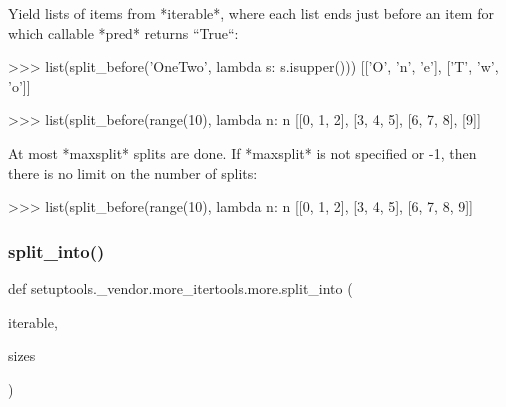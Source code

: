 \begin{DoxyVerb}Yield lists of items from *iterable*, where each list ends just before
an item for which callable *pred* returns ``True``:

    >>> list(split_before('OneTwo', lambda s: s.isupper()))
    [['O', 'n', 'e'], ['T', 'w', 'o']]

    >>> list(split_before(range(10), lambda n: n %
    [[0, 1, 2], [3, 4, 5], [6, 7, 8], [9]]

At most *maxsplit* splits are done. If *maxsplit* is not specified or -1,
then there is no limit on the number of splits:

    >>> list(split_before(range(10), lambda n: n %
    [[0, 1, 2], [3, 4, 5], [6, 7, 8, 9]]
\end{DoxyVerb}
 \mbox{\label{namespacesetuptools_1_1__vendor_1_1more__itertools_1_1more_a5ed35ee953b8004cf902dcd7b31714f3}} 
\subsubsection{\texorpdfstring{split\+\_\+into()}{split\_into()}}
{\footnotesize\ttfamily def setuptools.\+\_\+vendor.\+more\+\_\+itertools.\+more.\+split\+\_\+into (\begin{DoxyParamCaption}\item[{}]{iterable,  }\item[{}]{sizes }\end{DoxyParamCaption})}

